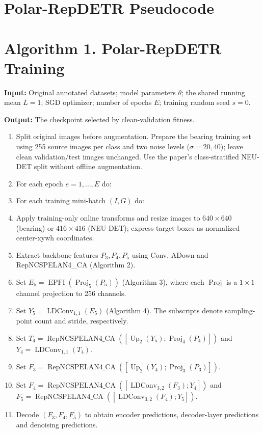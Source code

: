 \documentclass[10pt]{article}
\begin{document}
\section*{Polar-RepDETR Pseudocode}
\section*{Algorithm 1. Polar-RepDETR Training}
\textbf{Input:} Original annotated datasets; model parameters $\theta$; the shared running mean $\bar L=1$; SGD optimizer; number of epochs $E$; training random seed $s=0$.

\textbf{Output:} The checkpoint selected by clean-validation fitness.

\begin{enumerate}[label=\arabic*:,leftmargin=2em,itemsep=3pt]
\item Split original images before augmentation. Prepare the bearing training set using 255 source images per class and two noise levels ($\sigma=20,40$); leave clean validation/test images unchanged. Use the paper's class-stratified NEU-DET split without offline augmentation.
\item For each epoch $e=1,\ldots,E$ do:
\item For each training mini-batch $(I,G)$ do:
\item Apply training-only online transforms and resize images to $640\times640$ (bearing) or $416\times416$ (NEU-DET); express target boxes as normalized center-xywh coordinates.
\item Extract backbone features $P_3,P_4,P_5$ using Conv, ADown and RepNCSPELAN4\_CA (Algorithm 2).
\item Set $E_5=\operatorname{EPFI}(\operatorname{Proj}_5(P_5))$ (Algorithm 3), where each $\operatorname{Proj}$ is a $1\times1$ channel projection to 256 channels.
\item Set $Y_5=\operatorname{LDConv}_{1,1}(E_5)$ (Algorithm 4). The subscripts denote sampling-point count and stride, respectively.
\item Set $T_4=\operatorname{RepNCSPELAN4\_CA}([\operatorname{Up}_2(Y_5);\operatorname{Proj}_4(P_4)])$ and $Y_4=\operatorname{LDConv}_{1,1}(T_4)$.
\item Set $F_3=\operatorname{RepNCSPELAN4\_CA}([\operatorname{Up}_2(Y_4);\operatorname{Proj}_3(P_3)])$.
\item Set $F_4=\operatorname{RepNCSPELAN4\_CA}([\operatorname{LDConv}_{3,2}(F_3);Y_4])$ and $F_5=\operatorname{RepNCSPELAN4\_CA}([\operatorname{LDConv}_{3,2}(F_4);Y_5])$.
\item Decode $(F_3,F_4,F_5)$ to obtain encoder predictions, decoder-layer predictions and denoising predictions.

\end{enumerate}
\end{document}
